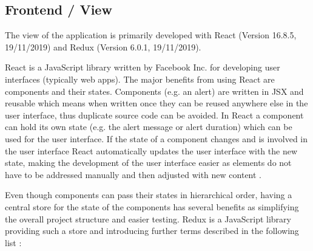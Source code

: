 \subsection{Frontend / View}
\label{sec:DomainCb}

The view of the application is primarily developed with React (Version 16.8.5, 19/11/2019) and Redux (Version 6.0.1, 19/11/2019).

React is a JavaScript library written by Facebook Inc. for developing user interfaces (typically web apps). The major benefits from using React are components and their states. Components (e.g. an alert) are written in \ac{JSX} and reusable which means when written once they can be reused anywhere else in the user interface, thus duplicate source code can be avoided. In React a component can hold its own state (e.g. the alert message or alert duration) which can be used for the user interface. If the state of a component changes and is involved in the user interface React automatically updates the user interface with the new state, making the development of the user interface easier as elements do not have to be addressed manually and then adjusted with new content \cite[p. 7-8]{stefanovDurchstartenMitReact2017}.

Even though components can pass their states in hierarchical order, having a central store for the state of the components has several benefits as simplifying the overall project structure and easier testing. Redux is a JavaScript library providing such a store and introducing further terms described in the following list \cite[p. 531-534]{freemanProReact162019}:

